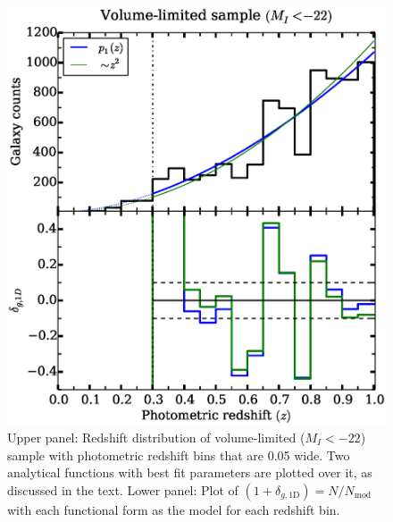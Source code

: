 \documentclass[twocolumn,useAMS,usenatbib]{mn2e}
\begin{document}
\begin{figure}
 \centering
  \includegraphics[width=\columnwidth]{redshift_vollimited}
  \caption{
Upper panel: Redshift distribution of volume-limited ($M_I <  -22$)
sample with photometric redshift bins that are 0.05 wide. Two
analytical functions with best fit parameters are plotted over it, as
discussed in the text. 
           Lower panel: Plot of $(1+\delta_{g,\text{1D}}) =
           N/N_{\text{mod}}$ with each functional form as the model
           for each redshift bin. } 
  \label{fig:redshift_vollimited}
\end{figure}

  
\end{document}
